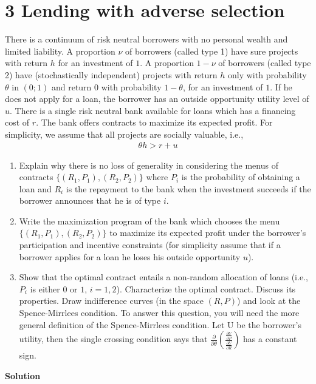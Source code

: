 \documentclass[a4paper]{article}
\begin{document}
\section*{3 Lending with adverse selection}
	There is a continuum of risk neutral borrowers with no personal wealth and limited
	liability. A proportion $\nu$ of borrowers (called type 1) have sure projects with return $h$ for
	an investment of $1$. A proportion $1-\nu$ of borrowers (called type 2) have (stochastically
	independent) projects with return $h$ only with probability $\theta$ in $(0; 1)$ and return $0$ with
	probability $1-\theta$, for an investment of $1$. If he does not apply for a loan, the borrower
	has an outside opportunity utility level of $u$.
	There is a single risk neutral bank available for loans which has a financing cost of
	$r$. The bank offers contracts to maximize its expected profit. For simplicity, we assume
	that all projects are socially valuable, i.e.,
	\begin{align*}
	\theta h > r + u
	\end{align*}
	\begin{enumerate}
	\item Explain why there is no loss of generality in considering the menus of contracts
	$\{(R_1, P_1),(R_2, P_2)\}$ where $P_i$
	is the probability of obtaining a loan and $R_i$
	is the
	repayment to the bank when the investment succeeds if the borrower announces
	that he is of type $i$.
	\item Write the maximization program of the bank which chooses the menu $\{(R_1, P_1),(R_2, P_2)\}$
	to maximize its expected profit under the borrower's participation and incentive
	constraints (for simplicity assume that if a borrower applies for a loan he loses his
	outside opportunity $u$).
	\item Show that the optimal contract entails a non-random allocation of loans (i.e., $P_i$
	is
	either $0$ or $1$, $i = 1, 2$). Characterize the optimal contract. Discuss its properties.
	Draw indifference curves (in the space $(R, P)$) and look at the Spence-Mirrlees
	condition. To answer this question, you will need the more general definition of the
	Spence-Mirrlees condition. Let U be the borrower's utility, then the single crossing
	condition says that $\frac{\partial }{\partial \theta}\left(\frac{\frac{\partial U}{\partial P}}{\frac{\partial U}{\partial R}}\right)$ has a constant sign.
	\end{enumerate}

\textbf{Solution}
\end{document}

